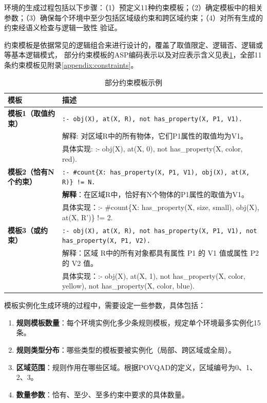 环境的生成过程包括以下步骤：（1）预定义11种约束模板；（2）确定模板中的相关参数；（3）确保每个环境中至少包括区域级约束和跨区域约束；（4）对所有生成的约束经语义检查与逻辑一致性
验证。

约束模板是依据常见的逻辑组合来进行设计的，覆盖了取值限定、逻辑否、逻辑或等基本逻辑模式，
部分约束模板的ASP编码表示以及对应表示含义见表\ref{tab:asp_templates}，全部11条约束模板见附录\ref{appendix:constraints}。
\begin{table}[h]
    \centering
    \renewcommand{\arraystretch}{1.0}
    \begin{tabular}{|p{3cm}|p{12cm}|}
        \hline
        \textbf{模板} & \textbf{描述} \\
        \hline
        \textbf{模板1（取值约束）} & 
        \texttt{:- obj(X), at(X, R), not has\_property(X, P1, V1).} \\ 
        & 解释: 对区域R中的所有物体，它们P1属性的取值均为V1。 \\ 
        & 具体实现: :- obj(X), at(X, 0), not has\_property(X, color, red). \\
        \hline
        \textbf{模板2（恰有N个约束）} & 
        \texttt{:- \#count\{X: has\_property(X, P1, V1), obj(X), at(X, R)\} != N.} \\ 
        & \textbf{解释}：在区域R中，恰好有N个物体的P1属性的取值为V1。 \\ 
        & 具体实现：:- \#count\{X: has\_property(X, size, small), obj(X), at(X, R')\} != 2. \\
        \hline
        \textbf{模板3（或约束）} & 
        \texttt{:- obj(X), at(X, R), not has\_property(X, P1, V1), not has\_property(X, P1, V2).} \\ 
        & 解释：区域 R中的所有对象都具有属性 P1 的 V1 值或属性 P2 的 V2 值。 \\ 
        & 具体实现：:- obj(X), at(X, 1), not has\_property(X, color, yellow), not has\_property(X, color, blue). \\
        \hline
    \end{tabular}
    \caption{部分约束模板示例}
    \label{tab:asp_templates}
\end{table}

模板实例化生成环境的过程中，需要设定一些参数，具体包括：
\begin{enumerate}[nosep]
\item \textbf{规则模板数量}：每个环境实例化多少条规则模板，规定单个环境最多实例化15条。
\item \textbf{规则类型分布}：哪些类型的模板要被实例化（局部、跨区域或全局）。
\item \textbf{区域范围}：规则作用在哪些区域。根据POVQAD的定义，区域编号为0、1、2、3。
\item \textbf{数量参数}：恰有、至少、至多约束中要求的具体数量。
\end{enumerate}

